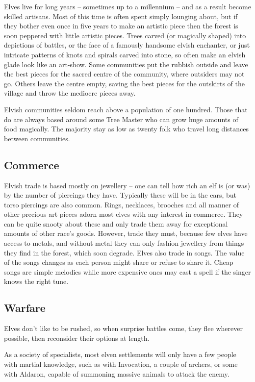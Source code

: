 \begin{multicols}{2}
Elves live for long years -- sometimes up to a millennium -- and as a result become skilled artisans.
Most of this time is often spent simply lounging about, but if they bother even once in five years to make an artistic piece then the forest is soon peppered with little artistic pieces.
Trees carved (or magically shaped) into depictions of battles, or the face of a famously handsome elvish enchanter, or just intricate patterns of knots and spirals carved into stone, so often make an elvish glade look like an art-show.
Some communities put the rubbish outside and leave the best pieces for the sacred centre of the community, where outsiders may not go.
Others leave the centre empty, saving the best pieces for the outskirts of the village and throw the mediocre pieces away.

Elvish communities seldom reach above a population of one hundred.
Those that do are always based around some Tree Master who can grow huge amounts of food magically.
The majority stay as low as twenty folk who travel long distances between communities.

\subsection{Commerce}

Elvish trade is based mostly on jewellery -- one can tell how rich an elf is (or was) by the number of piercings they have.
Typically these will be in the ears, but torso piercings are also common.
Rings, necklaces, brooches and all manner of other precious art pieces adorn most elves with any interest in commerce.
They can be quite snooty about these and only trade them away for exceptional amounts of other race's goods.
However, trade they must, because few elves have access to metals, and without metal they can only fashion jewellery from things they find in the forest, which soon degrade.
Elves also trade in songs.
The value of the songs changes as each person might share or refuse to share it.
Cheap songs are simple melodies while more expensive ones may cast a spell if the singer knows the right tune.

\subsection{Warfare}

Elves don't like to be rushed, so when surprise battles come, they flee wherever possible, then reconsider their options at length.

As a society of specialists, most elven settlements will only have a few people with martial knowledge, such as  with Invocation, a couple of archers, or some with Aldaron, capable of summoning massive animals to attack the enemy.


\end{multicols}
